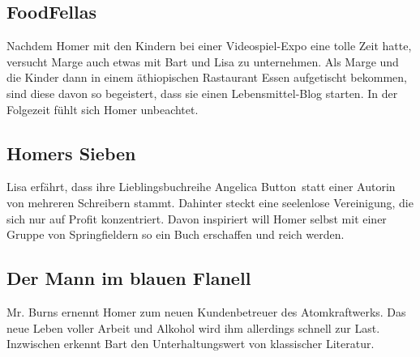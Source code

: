 \subsection{FoodFellas}
Nachdem Homer mit den Kindern bei einer Videospiel-Expo eine tolle Zeit hatte, versucht Marge auch etwas mit Bart und Lisa zu unternehmen. Als Marge und die Kinder dann in einem äthiopischen Rastaurant Essen aufgetischt bekommen, sind diese davon so begeistert, dass sie einen Lebensmittel-Blog starten. In der Folgezeit fühlt sich Homer unbeachtet.


\subsection{Homers Sieben}\label{NABF22}
Lisa erfährt, dass ihre Lieblingsbuchreihe \glqq Angelica Button\grqq\ statt einer Autorin von mehreren Schreibern stammt. Dahinter steckt eine seelenlose Vereinigung, die sich nur auf Profit konzentriert. Davon inspiriert will Homer selbst mit einer Gruppe von Springfieldern so ein Buch erschaffen und reich werden.


\subsection{Der Mann im blauen Flanell}
Mr. Burns ernennt Homer zum neuen Kundenbetreuer des Atomkraftwerks. Das neue Leben voller Arbeit und Alkohol wird ihm allerdings schnell zur Last. Inzwischen erkennt Bart den Unterhaltungswert von klassischer Literatur.

